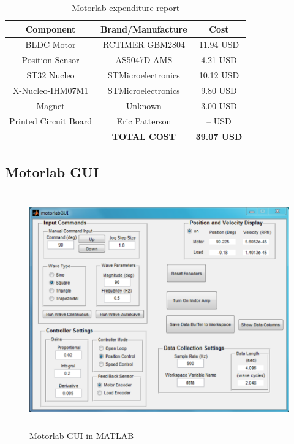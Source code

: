 \begin{table}[ht]
\begin{center}
\caption{Motorlab expenditure report}
\begin{tabular}[c]{|c|c|c|}

\hline
\textbf{Component} & \textbf{Brand/Manufacture} & \textbf{Cost} \\

\hline
BLDC Motor & RCTIMER GBM2804 & 11.94 USD\\

\hline
Position Sensor & AS5047D AMS & 4.21 USD\\

\hline
ST32 Nucleo & STMicroelectronics & 10.12 USD\\

\hline
X-Nucleo-IHM07M1 & STMicroelectronics & 9.80 USD\\

\hline
Magnet & Unknown & 3.00 USD\\

\hline
Printed Circuit Board & Eric Patterson & -- USD\\

\hline
& \textbf{TOTAL COST} & \textbf{39.07 USD}\\
\hline
\end{tabular}

\label{table1}
\end{center}
\end{table}

\newpage
\subsection{Motorlab GUI}
\label{makereference2.1.4} 
\begin{figure}[htb]
\begin{center}
    \includegraphics[height=4in]{figures/old_motorlab_gui.png}

    \caption[Motorlab GUI in MATLAB]{Motorlab GUI in MATLAB}

    \label{motorlab_gui_in_matlab}
\end{center}
\end{figure}


